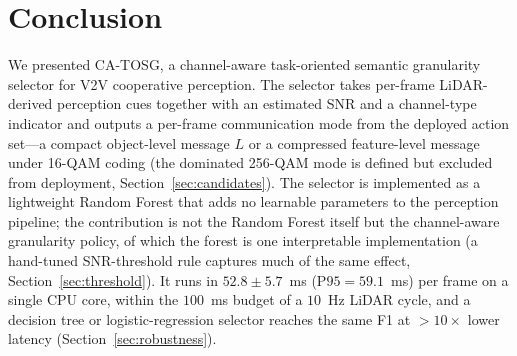 \documentclass[journal]{IEEEtran}
\newcommand{\method}{CA-TOSG}
\begin{document}
\section{Conclusion}

We presented \method{}, a channel-aware task-oriented semantic granularity selector for V2V cooperative perception. The selector takes per-frame LiDAR-derived perception cues together with an estimated SNR and a channel-type indicator and outputs a per-frame communication mode from the deployed action set---a compact object-level message $L$ or a compressed feature-level message under 16-QAM coding (the dominated 256-QAM mode is defined but excluded from deployment, Section~\ref{sec:candidates}). The selector is implemented as a lightweight Random Forest that adds no learnable parameters to the perception pipeline; the contribution is not the Random Forest itself but the channel-aware granularity policy, of which the forest is one interpretable implementation (a hand-tuned SNR-threshold rule captures much of the same effect, Section~\ref{sec:threshold}). It runs in $52.8 \pm 5.7$~ms ($\mathrm{P95} = 59.1$~ms) per frame on a single CPU core, within the $100$~ms budget of a $10$~Hz LiDAR cycle, and a decision tree or logistic-regression selector reaches the same F1 at $>10\times$ lower latency (Section~\ref{sec:robustness}).
\end{document}
